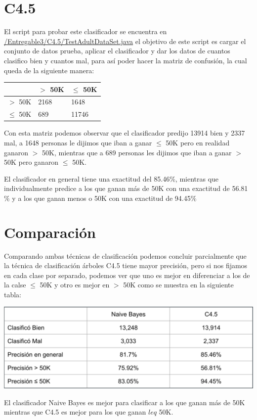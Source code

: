\documentclass{article}
\begin{document}
 \section{C4.5}

 El script para probar este clasificador se encuentra en \href{https://github.com/rodrigorojo/ProyectoFinalMineria/blob/master/Entregable3/NaiveBayes/TestAdultDataSet.java} {/Entregable3/C4.5/TestAdultDataSet.java} el objetivo de este script es cargar el conjunto de datos prueba, aplicar el clasificador y dar los datos de cuantos clasifico bien y cuantos mal, para así poder hacer la matriz de confusión, la cual queda de la siguiente manera:
 \begin{center}
   \begin{tabular}{|p{2cm}|p{2cm}|p{2cm}|}
     \hline
                  & $>$ 50K & $\leq$ 50K  \\ \hline
      $>$ 50K     & 2168    & 1648         \\ \hline
      $\leq$ 50K  & 689    & 11746        \\ \hline
    \end{tabular}
 \end{center}
 Con esta matriz podemos observar que el clasificador predijo 13914 bien y 2337 mal, a 1648 personas le dijimos que iban a ganar $\leq$ 50K pero en realidad ganaron $>$ 50K, mientras que a 689 personas les dijimos que iban a ganar $>$ 50K pero ganaron $\leq$ 50K.

 El clasificador en general tiene una exactitud del 85.46$\%$, mientras que individualmente predice a los que ganan más de 50K con una exactitud de 56.81$\%$ y a los que ganan menos o 50K con una exactitud de 94.45$\%$
 \section{Comparación}
 Comparando ambas técnicas de clasificación podemos concluir parcialmente que la técnica de clasificación árboles C4.5 tiene mayor precisión, pero si nos fijamos en cada clase por separado, podemos ver que uno es mejor en diferenciar a los de la calse $\leq$ 50K y otro es mejor en $>$ 50K como se muestra en la siguiente tabla:
\begin{center}
  \includegraphics[scale=0.5]{tabla}
\end{center}
El clasificador Naive Bayes es mejor para clasificar a los que ganan más de 50K mientras que C4.5 es mejor para los que ganan $leq$ 50K.
\end{document}

